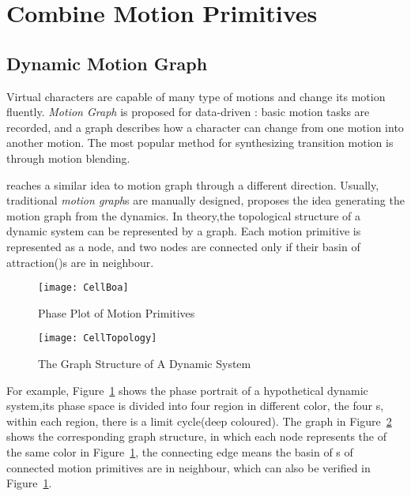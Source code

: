 \section{Combine Motion Primitives}
\label{sec:manyprimitive}

\subsection{Dynamic Motion Graph}
Virtual characters are capable of many type of motions and change its motion fluently.
\emph{Motion Graph}\citep{kovar2008motion} is proposed for data-driven \cms:
basic motion tasks are recorded, and a graph describes how a character can change from one motion into another motion. 
The most popular method for synthesizing transition motion is through motion blending.


\moit reaches a similar idea to motion graph through a different direction.
Usually, traditional \emph{motion graph}s are manually designed, \moit proposes the idea generating the motion graph from the dynamics.
In theory,the topological structure of a dynamic system can be represented by a  graph.
Each motion primitive is represented as a node, and two nodes are connected only if their basin of attraction(\boa)s are in neighbour.

\begin{figure}[!htbp]
  \begin{center}
	\texttt{[image: CellBoa]}
    \caption{Phase Plot of Motion Primitives}
    \label{fig:manyprimitives}
  \end{center}
\end{figure}


\begin{figure}[!htbp]
  \begin{center}
      \texttt{[image: CellTopology]}
    \caption{The Graph Structure of A Dynamic System}
    \label{fig:manyprimitivesgraph}
  \end{center}
\end{figure}

For example, Figure~\ref{fig:manyprimitives} shows the phase portrait of a hypothetical dynamic system,its phase space is divided into four region in different color, the four \boa s, within each region, there is a limit cycle(deep coloured).
The graph in Figure~\ref{fig:manyprimitivesgraph} shows the corresponding graph structure, in which each node represents the \boa of the same color in Figure~\ref{fig:manyprimitives}, the connecting edge means the basin of {\boa}s of connected motion primitives are in neighbour, which can also be verified in Figure~\ref{fig:manyprimitives}.


